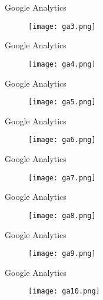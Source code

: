 \begin{frame}{Google Analytics}
	\begin{figure}[t]
		\centering
		\texttt{[image: ga3.png]}
	\end{figure}
\end{frame}

\begin{frame}{Google Analytics}
	\begin{figure}[t]
		\centering
		\texttt{[image: ga4.png]}
	\end{figure}
\end{frame}

\begin{frame}{Google Analytics}
	\begin{figure}[t]
		\centering
		\texttt{[image: ga5.png]}
	\end{figure}
\end{frame}

\begin{frame}{Google Analytics}
	\begin{figure}[t]
		\centering
		\texttt{[image: ga6.png]}
	\end{figure}
\end{frame}

\begin{frame}{Google Analytics}
	\begin{figure}[t]
		\centering
		\texttt{[image: ga7.png]}
	\end{figure}
\end{frame}

\begin{frame}{Google Analytics}
	\begin{figure}[t]
		\centering
		\texttt{[image: ga8.png]}
	\end{figure}
\end{frame}

\begin{frame}{Google Analytics}
	\begin{figure}[t]
		\centering
		\texttt{[image: ga9.png]}
	\end{figure}
\end{frame}

\begin{frame}{Google Analytics}
	\begin{figure}[t]
		\centering
		\texttt{[image: ga10.png]}
	\end{figure}
\end{frame}

